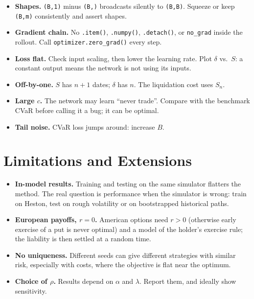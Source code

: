 \documentclass[11pt]{article}
\theoremstyle{definition}
\theoremstyle{remark}
\begin{document}
\begin{itemize}[leftmargin=*]
  \item \textbf{Shapes.} \texttt{(B,1)} minus \texttt{(B,)} broadcasts silently to \texttt{(B,B)}. Squeeze or keep \texttt{(B,m)} consistently and assert shapes.
  \item \textbf{Gradient chain.} No \texttt{.item()}, \texttt{.numpy()}, \texttt{.detach()}, or \texttt{no\_grad} inside the rollout. Call \texttt{optimizer.zero\_grad()} every step.
  \item \textbf{Loss flat.} Check input scaling, then lower the learning rate. Plot $\delta$ vs.\ $S$: a constant output means the network is not using its inputs.
  \item \textbf{Off-by-one.} $S$ has $n+1$ dates; $\delta$ has $n$. The liquidation cost uses $S_n$.
  \item \textbf{Large $c$.} The network may learn ``never trade''. Compare with the benchmark CVaR before calling it a bug; it can be optimal.
  \item \textbf{Tail noise.} CVaR loss jumps around: increase $B$.
\end{itemize}

\section{Limitations and Extensions}

\begin{itemize}[leftmargin=*]
  \item \textbf{In-model results.} Training and testing on the same simulator flatters the method. The real question is performance when the
        simulator is wrong: train on Heston, test on rough volatility or on bootstrapped historical paths.
  \item \textbf{European payoffs, $r=0$.} American options need $r>0$ (otherwise early exercise of a put is never optimal) and a model of the holder's
        exercise rule; the liability is then settled at a random time.
  \item \textbf{No uniqueness.} Different seeds can give different strategies with similar risk, especially with costs, where the objective is flat near the optimum.
  \item \textbf{Choice of $\rho$.} Results depend on $\alpha$ and $\lambda$. Report them, and ideally show sensitivity.
\end{itemize}
\end{document}
